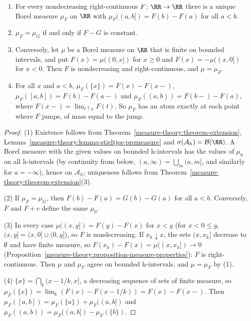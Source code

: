 \begin{theorem}\label{measure-theory:theorem-lebesgue-stieltjes}
\begin{enumerate}
\item For every nondecreasing right-continuous $F \colon \RR \to \RR$ there is a unique Borel measure $\mu_F$ on $\RR$ with $\mu_F((a, b]) = F(b) - F(a)$ for all $a < b$.
\item $\mu_F = \mu_G$ if and only if $F - G$ is constant.
\item Conversely, let $\mu$ be a Borel measure on $\RR$ that is finite on bounded intervals, and put $F(x) = \mu((0, x])$ for $x \geq 0$ and $F(x) = -\mu((x, 0])$ for $x < 0$. Then $F$ is nondecreasing and
right-continuous, and $\mu = \mu_F$.
\item For all $x$ and $a < b$, $\mu_F(\{x\}) = F(x) - F(x-)$, $\mu_F([a, b]) = F(b) - F(a-)$ and $\mu_F((a, b)) = F(b-) - F(a)$, where $F(x-) = \lim_{t \uparrow x}F(t)$. So $\mu_F$ has an atom
exactly at each point where $F$ jumps, of mass equal to the jump.
\end{enumerate}
\end{theorem}

\begin{proof}
(1) Existence follows from Theorem~\ref{measure-theory:theorem-extension}, Lemma~\ref{measure-theory:lemma-stieltjes-premeasure} and $\sigma(\mathcal{A}_h) = \mathcal{B}(\RR)$. A Borel measure with the
given values on bounded h-intervals has the values of $\mu_0$ on all h-intervals (by continuity from below, $(a, \infty) = \bigcup_m(a, m]$, and similarly for $a = -\infty$), hence on
$\mathcal{A}_h$; uniqueness follows from Theorem~\ref{measure-theory:theorem-extension}(3).

(2) If $\mu_F = \mu_G$, then $F(b) - F(a) = G(b) - G(a)$ for all $a < b$. Conversely, $F$ and $F + c$ define the same $\mu_0$.

(3) In every case $\mu((x, y]) = F(y) - F(x)$ for $x < y$ (for $x < 0 \leq y$, $(x, y] = (x, 0] \sqcup (0, y]$), so $F$ is nondecreasing. If $x_k \downarrow x$, the sets $(x, x_k]$ decrease to
$\emptyset$ and have finite measure, so $F(x_k) - F(x) = \mu((x, x_k]) \to 0$ (Proposition~\ref{measure-theory:proposition-measure-properties}): $F$ is right-continuous. Then $\mu$ and $\mu_F$ agree on
bounded h-intervals, and $\mu = \mu_F$ by (1).

(4) $\{x\} = \bigcap_k(x - 1/k, x]$, a decreasing sequence of sets of finite measure, so $\mu_F(\{x\}) = \lim_k(F(x) - F(x - 1/k)) = F(x) - F(x-)$. Then
$\mu_F([a, b]) = \mu_F(\{a\}) + \mu_F((a, b])$ and $\mu_F((a, b)) = \mu_F((a, b]) - \mu_F(\{b\})$.
\end{proof}

